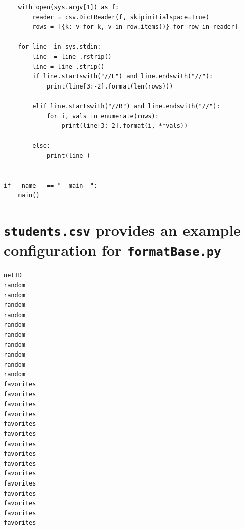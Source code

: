 \documentclass[pageno]{jpaper}
\begin{document}
\begin{appendices}
\begin{verbatim}
    with open(sys.argv[1]) as f:
        reader = csv.DictReader(f, skipinitialspace=True)
        rows = [{k: v for k, v in row.items()} for row in reader]

    for line_ in sys.stdin:
        line_ = line_.rstrip()
        line = line_.strip()
        if line.startswith("//L") and line.endswith("//"):
            print(line[3:-2].format(len(rows)))

        elif line.startswith("//R") and line.endswith("//"):
            for i, vals in enumerate(rows):
                print(line[3:-2].format(i, **vals))

        else:
            print(line_)


if __name__ == "__main__":
    main()

\end{verbatim}

  \newpage
  \section{\texttt{students.csv} provides an example configuration for \texttt{formatBase.py}}\label{appendix:students}
\begin{Verbatim}
netID
random
random
random
random
random
random
random
random
random
random
favorites
favorites
favorites
favorites
favorites
favorites
favorites
favorites
favorites
favorites
favorites
favorites
favorites
favorites
favorites
\end{Verbatim}

\newpage

\end{appendices}
\end{document}
